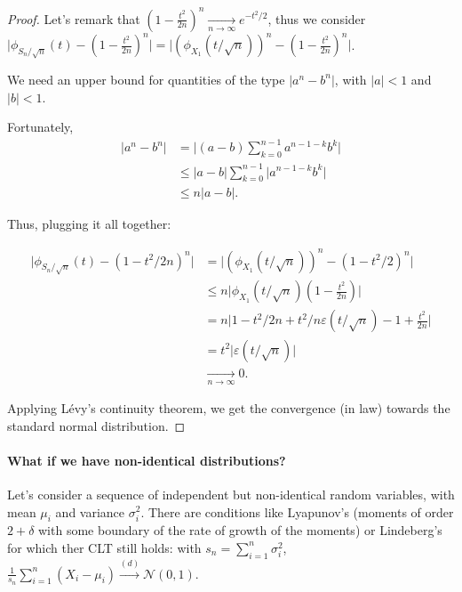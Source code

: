 \begin{proof}
    Let's remark that $\left(1-\frac{t^2}{2n}\right)^n \underset{n \to \infty}{\longrightarrow} e^{-t^2/2}$, thus we consider $\Big\lvert \phi_{S_n/\sqrt{n}}(t) - (1-\frac{t^2}{2n})^n \Big\rvert = \Big\lvert \left(\phi_{X_1}(t/ \sqrt{n})\right)^n - (1-\frac{t^2}{2n})^n \Big\rvert $.

    We need an upper bound for quantities of the type $\lvert a^n - b^n \rvert$, with $\lvert a \rvert < 1$ and $\lvert b \rvert < 1$.

    Fortunately, 
    \begin{align*}
        \lvert a^n - b^n \rvert &= \Big\lvert (a-b) \sum_{k=0}^{n-1} a^{n-1-k} b^k \Big\rvert\\
        &\leq \lvert a-b \rvert \sum_{k=0}^{n-1} \Big\lvert  a^{n-1-k} b^k \Big\rvert\\
        &\leq n\lvert a-b \rvert.
    \end{align*}

    Thus, plugging it all together:

    \begin{align*}
        \Big\lvert \phi_{S_n/\sqrt{n}}(t) - (1-t^2/2n)^n \Big\rvert &= \Big\lvert \left(\phi_{X_1}(t/ \sqrt{n})\right)^n - (1-t^2/2)^n \Big\rvert\\
        &\leq n \Big\lvert \phi_{X_1}(t/ \sqrt{n}) (1-\frac{t^2}{2n}) \Big\rvert\\
        &= n \Big\lvert 1 - t^2/2n + t^2/n \varepsilon (t/\sqrt{n}) - 1 + \frac{t^2}{2n}\Big\rvert\\
        &= t^2 \lvert \varepsilon (t/\sqrt{n}) \rvert\\
        &\underset{n \to \infty}{\longrightarrow} 0.
    \end{align*}

    Applying L\'evy's continuity theorem, we get the convergence (in law) towards the standard normal distribution.

\end{proof}

\paragraph*{What if we have non-identical distributions?}

Let's consider a sequence of independent but non-identical random variables, with mean $\mu_i$ and variance $\sigma_i^2$. There are conditions like Lyapunov's (moments of order $2+\delta$ with some boundary of the rate of growth of the moments) or Lindeberg's for which ther CLT still holds: with $s_n = \sum_{i=1}^n \sigma_i^2$, $\frac1{s_n} \sum_{i=1}^n (X_i - \mu_i) \overset{(d)}{\longrightarrow} \mathcal{N}(0,1)$.

